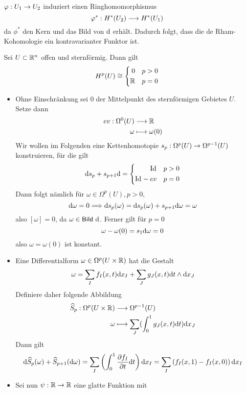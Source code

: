 \Bem{}
$\varphi : U_1 \overset{}{\rightarrow} U_2$ induziert einen Ringhomomorphismus
\[ \varphi^* : H^*(U_2) \overset{}{\longrightarrow} H^*(U_1) \]
da $\phi^*$ den Kern und das Bild von $\text{d}$ erhält. Dadurch folgt, dass die de Rham-Kohomologie ein kontravarianter Funktor ist.

Sei $U \subset \mathbb{R}^n$ offen und sternförmig. Dann gilt
\[ 
H^p(U) \overset{}{\cong} \left\lbrace
\begin{aligned}
0 && p > 0\\
\mathbb{R} && p =0
\end{aligned}
\right.
\]

\begin{Beweis}{}
\begin{itemize}
	\item Ohne Einschränkung sei $0$ der Mittelpunkt des sternförmigen Gebietes $U$. Setze dann
	\begin{align*}
	ev : \Omega^0(U) & \overset{}{\longrightarrow} \mathbb{R} \\
	\omega & \longmapsto \omega(0)
	\end{align*}
	Wir wollen im Folgenden eine Kettenhomotopie $s_p : \Omega^p(U) \overset{}{\rightarrow} \Omega^{p-1}(U)$ konstruieren, für die gilt
	\[\text{d} s_p + s_{p+1} \text{d} = \left\lbrace
	\begin{aligned}
	\text{Id}_{} && p > 0\\
	\text{Id}_{} - ev && p = 0
	\end{aligned}
	\right. \]
	Dann folgt nämlich für $\omega \in \Omega^p(U), p > 0,$
	\[ \text{d} \omega = 0 \overset{}{\Longrightarrow} \text{d} s_p (\omega) = \text{d} s_p(\omega) +s_{p+1}\text{d}\omega = \omega \]
	also $[\omega] = 0$, da $\omega \in \textsf{Bild}\ \text{d}$. Ferner gilt für $p = 0$
	\[\omega - \omega(0) = s_1\text{d} \omega = 0\]
	also $\omega = \omega(0)$ ist konstant.
	\item Eine Differentialform $\omega \in \Omega^p(U\times \mathbb{R})$ hat die Gestalt
	\begin{align*}
	\omega = \sum_I f_I(x,t) \text{d} x_I + \sum_J g_J(x,t) \text{d} t \wedge \text{d} x_J
	\end{align*}
	Definiere daher folgende Abbildung
	\begin{align*}
	\widehat{S}_p : \Omega^p(U\times \mathbb{R} ) &\overset{}{\longrightarrow} \Omega^{p-1}(U)\\
	\omega & \longmapsto \sum_J (\int_0^1 g_J(x,t) \text{d} t ) \text{d} x_J
	\end{align*}
	Dann gilt
	\[	\text{d} \widehat{S}_p(\omega) + 	\widehat{S}_{p+1}(\text{d}\omega) =
	\sum_I \left( \int_0^1 \frac{\partial f_I}{\partial t} \text{d} t \right) \text{d} x_I 
	=
	\sum_I \left( f_I(x,1) - f_I(x,0)\right) \text{d} x_I   \]
	\item Sei nun $\psi : \mathbb{R} \overset{}{\rightarrow} \mathbb{R}$ eine glatte Funktion mit

\end{itemize}
\end{Beweis}
